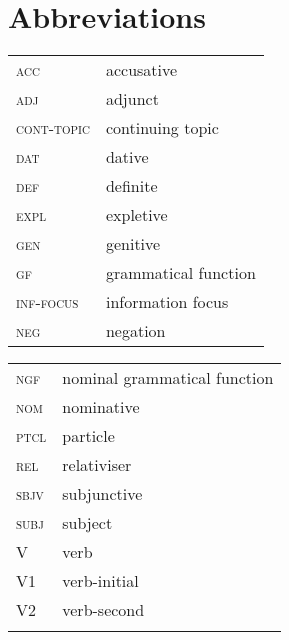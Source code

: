 \documentclass[output=paper,colorlinks,citecolor=brown]{langscibook}
\begin{document}
\section*{Abbreviations}
\begin{tabularx}{.5\textwidth}{@{}lQ@{}}
\textsc{acc} & accusative \\
\textsc{adj} & adjunct\\
\textsc{cont-topic}  & continuing topic\\
\textsc{dat} & dative \\
\textsc{def} & definite\\
\textsc{expl} & expletive\\
\textsc{gen} & genitive \\
\textsc{gf} & grammatical function\\
\textsc{inf-focus} & information focus\\
\textsc{neg} & negation \\
\end{tabularx}%
\begin{tabularx}{.5\textwidth}{@{}lQ@{}}
\textsc{ngf} & nominal grammatical function\\
\textsc{nom} & nominative \\
\textsc{ptcl} & particle \\
\textsc{rel} & relativiser\\
\textsc{sbjv} & subjunctive\\
\textsc{subj} & subject\\
V & verb\\
V1 & verb-initial\\
V2 & verb-second\\
\\
\end{tabularx}

\DeclareRobustCommand{\disambiguate}[3]{#1}
\sloppy
\printbibliography[heading=subbibliography,notkeyword=this]
\end{document}
